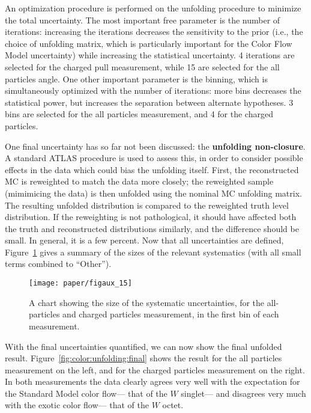 An optimization procedure is performed on the unfolding procedure to minimize the total uncertainty. The most important free parameter is the number of iterations: increasing the iterations decreases the sensitivity to the prior (i.e., the choice of unfolding matrix, which is particularly important for the Color Flow Model uncertainty) while increasing the statistical uncertainty. 4 iterations are selected for the charged pull measurement, while 15 are selected for the all particles angle. One other important parameter is the binning, which is simultaneously optimized with the number of iterations: more bins decreases the statistical power, but increases the separation between alternate hypotheses. 3 bins are selected for the all particles measurement, and 4 for the charged particles.

One final uncertainty has so far not been discussed: the \textbf{unfolding non-closure}. A standard ATLAS procedure is used to assess this, in order to consider possible effects in the data which could bias the unfolding itself. First, the reconstructed MC is reweighted to match the data more closely; the reweighted sample (mimimicing the data) is then unfolded using the nominal MC unfolding matrix. The resulting unfolded distribution is compared to the reweighted truth level distribution. If the reweighting is not pathological, it should have affected both the truth and reconstructed distributions similarly, and the difference should be small. In general, it is a few percent. Now that all uncertainties are defined, Figure~\ref{fig:color:unfolding:uncert_chart} gives a summary of the sizes of the relevant systematics (with all small terms combined to ``Other'').



\begin{figure}[htbp]
  \centering
    \texttt{[image: paper/figaux\_15]}
  \caption{A chart showing the size of the systematic uncertainties, for the all-particles and charged particles measurement, in the first bin of each measurement.}
  \label{fig:color:unfolding:uncert_chart}
\end{figure}

With the final uncertainties quantified, we can now show the final unfolded result. Figure~\ref{fig:color:unfolding:final} shows the result for the all particles measurement on the left, and for the charged particles measurement on the right. In both measurements the data clearly agrees very well with the expectation for the Standard Model color flow--- that of the $W$ singlet--- and disagrees very much with the exotic color flow--- that of the $W$ octet. 


